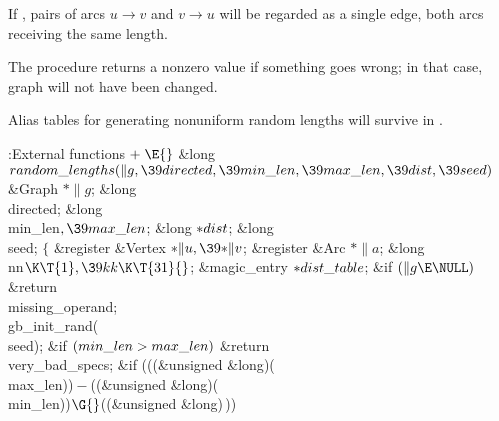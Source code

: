 If , pairs of arcs $u\to v$ and $v\to u$ will be
regarded as
a single edge, both arcs receiving the same length.

The procedure returns a nonzero value if something goes wrong; in that
case, graph  will not have been changed.

Alias tables for generating nonuniform random lengths will survive
in .

\Y\B\4:External functions\X${}\mathrel+\E{}$\6
\1\1\&{long} ${}\\{random\_lengths}(\|g,\39\\{directed},\39\\{min\_len},\39%
\\{max\_len},\39\\{dist},\39\\{seed}){}$\6
\&{Graph} ${}{*}\|g{}$;\6
\&{long} \\{directed};\6
\&{long} \\{min\_len}${},\39\\{max\_len}{}$;\6
\&{long} ${}{*}\\{dist}{}$;\6
\&{long} \\{seed};\2\2\6
${}\{{}$\5
\1\&{register} \&{Vertex} ${}{*}\|u,\39{*}\|v{}$;\6
\&{register} \&{Arc} ${}{*}\|a{}$;\6
\&{long} \\{nn}${}\K\T{1},\39\\{kk}\K\T{31}{}$;\6
\&{magic\_entry} ${}{*}\\{dist\_table}{}$;\7
\&{if} ${}(\|g\E\NULL){}$\1\5
\&{return} \\{missing\_operand};\2\6
\\{gb\_init\_rand}(\\{seed});\6
\&{if} ${}(\\{min\_len}>\\{max\_len}){}$\1\5
\&{return} \\{very\_bad\_specs};\2\6
\&{if} (((\&{unsigned} \&{long})(\\{max\_len}))${}-{}$((\&{unsigned} \&{long})(%
\\{min\_len}))${}\G{}$((\&{unsigned} \&{long})\,))\1\5
